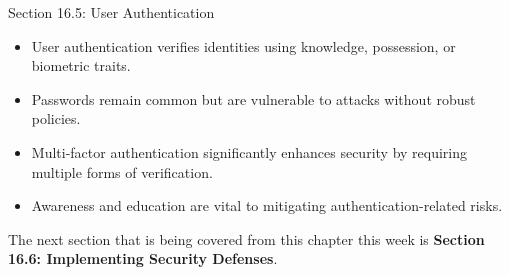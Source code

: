 \begin{notes}{Section 16.5: User Authentication}
    \begin{highlight}
        \begin{itemize}
            \item User authentication verifies identities using knowledge, possession, or biometric traits.
            \item Passwords remain common but are vulnerable to attacks without robust policies.
            \item Multi-factor authentication significantly enhances security by requiring multiple forms of verification.
            \item Awareness and education are vital to mitigating authentication-related risks.
        \end{itemize}
    \end{highlight}
\end{notes}

The next section that is being covered from this chapter this week is \textbf{Section 16.6: Implementing Security Defenses}.

